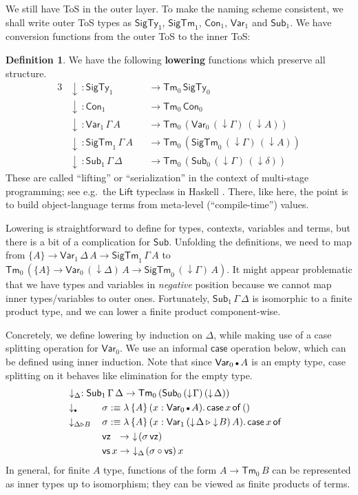 \documentclass[12pt,a4paper,twoside,openany]{book}
\theoremstyle{remark}
\theoremstyle{definition}
\newtheorem{mydefinition}{Definition}
\theoremstyle{theorem}
\newcommand{\ms}[1]{\mathsf{#1}}
\newcommand{\Con}{\mathsf{Con}}
\newcommand{\Sub}{\mathsf{Sub}}
\newcommand{\Tm}{\mathsf{Tm}}
\newcommand{\ext}{\triangleright}
\newcommand{\emptycon}{\scaleobj{.75}\bullet}
\newcommand{\SigTy}{\mathsf{SigTy}}
\newcommand{\SigTm}{\mathsf{SigTm}}
\newcommand{\Var}{\ms{Var}}
\newcommand{\vz}{\ms{vz}}
\newcommand{\vs}{\ms{vs}}
\newcommand{\down}{\downarrow}
\newcommand{\defn}{:\equiv}
\begin{document}
We still have ToS in the outer layer. To make the naming
scheme consistent, we shall write outer ToS types as $\SigTy_1$,
$\SigTm_1$, $\Con_1$, $\Var_1$ and $\Sub_1$. We have conversion functions from
the outer ToS to the inner ToS:
\begin{mydefinition}
\label{def:simple-lowering}
We have the following \textbf{lowering} functions which
preserve all structure.
\begin{alignat*}{3}
  & \down\,: \SigTy_1 &&\to \Tm_0\,\SigTy_0\\
  & \down\,: \Con_1 &&\to \Tm_0\,\Con_0\\
  & \down\,: \Var_1\,\Gamma\,A &&\to \Tm_0\,(\Var_0\,(\down\!\Gamma)\,(\down\!A))\\
  & \down\,: \SigTm_1\,\Gamma\,A &&\to \Tm_0\,(\SigTm_0\,(\down\!\Gamma)\,(\down\!A))\\
  & \down\,: \Sub_1\,\Gamma\,\Delta &&\to \Tm_0\,(\Sub_0\,(\down\!\Gamma)\,(\down\!\delta))
\end{alignat*}
These are called ``lifting'' or ``serialization'' in the context of
multi-stage programming; see e.g.\ the $\ms{Lift}$ typeclass in Haskell
\cite{pickering-multistage}. There, like here, the point is to build
object-language terms from meta-level (``compile-time'') values.

Lowering is straightforward to define for types, contexts, variables and terms,
but there is a bit of a complication for $\Sub$. Unfolding the definitions, we
need to map from $\{A\} \to \Var_1\,\Delta\,A \to \SigTm_1\,\Gamma\,A$ to
$\Tm_0\,(\{A\} \to \Var_0\,(\down\Delta)\,A \to \SigTm_0\,(\down\Gamma)\,A)$. It
might appear problematic that we have types and variables in \emph{negative}
position because we cannot map inner types/variables to outer ones.
Fortunately, $\Sub_1\,\Gamma\,\Delta$ is isomorphic to a finite product type,
and we can lower a finite product component-wise.

Concretely, we define lowering by induction on $\Delta$, while making use of
a case splitting operation for $\Var_0$. We use an informal $\ms{case}$
operation below, which can be defined using inner induction. Note that since
$\Var_0\,\emptycon\,A$ is an empty type, case splitting on it behaves like
elimination for the empty type.
\begin{alignat*}{3}
  &\rlap{$\hspace{0.3em}\down_{\Delta} : \Sub_1\,\Gamma\,\Delta \to \Tm_0\,(\Sub_0\,(\down\!\Gamma)\,(\down\!\Delta))$}\\
  &\down_{\emptycon}\,&&\sigma \defn
      \lambda\,\{A\}\,(x : \Var_0\,\emptycon\,A).\,\ms{case}\,x\,\ms{of}\,()\\
  &\down_{\Delta\ext B}\,&&\sigma \defn
      \lambda\,\{A\}\,(x : \Var_1\,(\down\!\Delta\,\ext \down\!B)\,A).\,\ms{case}\,x\,\ms{of}\\
  & &&\vz\hspace{0.65em}\to\,\,\down\!(\sigma\,\vz)\\
  & &&\vs\,x \to\,\,\down_{\Delta}\!(\sigma \circ \vs)\,x
\end{alignat*}
In general, for finite $A$ type, functions of the form $A \to \Tm_0\,B$ can be
represented as inner types up to isomorphism; they can be viewed as finite
products of terms.



\end{mydefinition}
\end{document}
